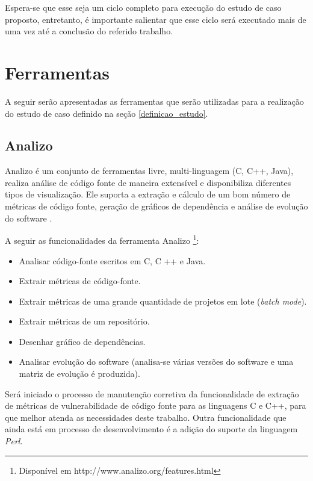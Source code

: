 Espera-se que esse seja um ciclo completo para execução do estudo de caso proposto, entretanto, é importante salientar que esse
ciclo será executado mais de uma vez até a conclusão do referido trabalho.

\section{Ferramentas} \label{tools}

A seguir serão apresentadas as ferramentas que serão utilizadas para a realização do estudo de caso definido na seção 
\ref{definicao_estudo}.

\subsection{Analizo}

Analizo é um conjunto de ferramentas livre, multi-linguagem (C, C++, Java), realiza análise de código fonte de maneira 
extensível e disponibiliza diferentes tipos de visualização. Ele suporta a extração e cálculo de um bom número de métricas de 
código fonte, geração de gráficos de dependência e análise de evolução do software \cite{analizo}.

A seguir as funcionalidades da ferramenta Analizo \footnote{Disponível em http://www.analizo.org/features.html}:

\begin{itemize}
  \item Analisar código-fonte escritos em C, C ++ e Java.
  \item Extrair métricas de código-fonte.
  \item Extrair métricas de uma grande quantidade de projetos em lote (\textit{batch mode}).
  \item Extrair métricas de um repositório.
  \item Desenhar gráfico de dependências.
  \item Analisar evolução do software (analisa-se várias versões do software e uma matriz de evolução é produzida).
\end{itemize}

Será iniciado o processo de manutenção corretiva da funcionalidade de extração de métricas de vulnerabilidade de código fonte 
para as linguagens C e C++, para que melhor atenda as necessidades deste trabalho. Outra funcionalidade que ainda está em 
processo de desenvolvimento é a adição do suporte da linguagem \textit{Perl}.

